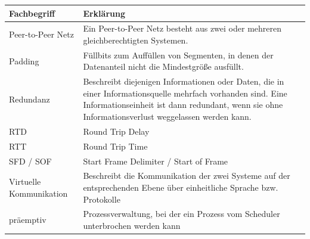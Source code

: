 \documentclass[12pt,a4paper]{article}
\begin{document}
    \begin{table}[h]
        \renewcommand{\arraystretch}{2}
        \begin{tabularx}{17cm}{|l|X|}
            \hline
            Fachbegriff&Erklärung\\
            \hline
            \hline
            Peer-to-Peer Netz&Ein Peer-to-Peer Netz besteht aus zwei oder mehreren gleichberechtigten Systemen.\\
            \hline
            Padding&Füllbits zum Auffüllen von Segmenten, in denen der Datenanteil nicht die Mindestgröße ausfüllt.\\
            \hline
            Redundanz&Beschreibt diejenigen Informationen oder Daten, die in einer Informationsquelle mehrfach vorhanden sind. Eine Informationseinheit ist dann redundant, wenn sie ohne Informationsverlust weggelassen werden kann.\\
            \hline
            RTD&Round Trip Delay\\
            \hline
            RTT&Round Trip Time\\
            \hline
            SFD / SOF& Start Frame Delimiter / Start of Frame\\
            \hline
            Virtuelle Kommunikation&Beschreibt die Kommunikation der zwei Systeme auf der entsprechenden Ebene über einheitliche Sprache bzw. Protokolle\\
            \hline
            präemptiv&Prozessverwaltung, bei der ein Prozess vom Scheduler unterbrochen werden kann \\
            \hline
        \end{tabularx}
    \end{table}
\end{document}
